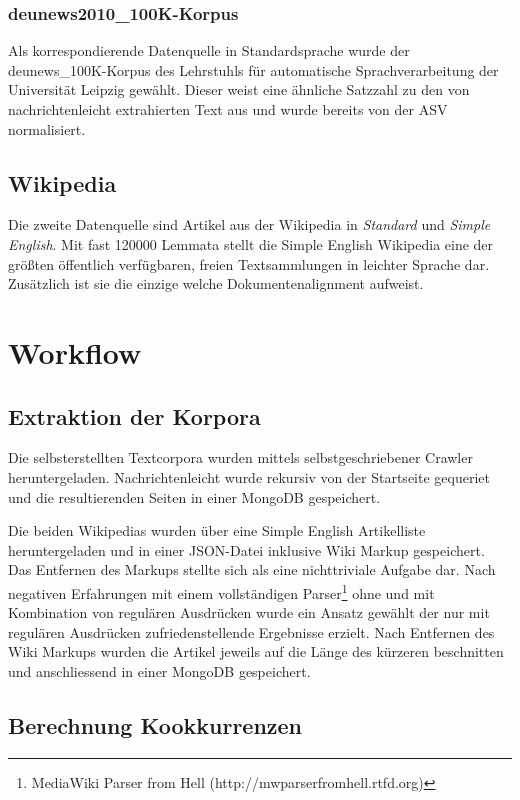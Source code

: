 \documentclass[12pt, a4paper]{article}
\begin{document}
\subsubsection{deunews2010\_100K-Korpus}

Als korrespondierende Datenquelle in Standardsprache wurde der
deunews\_100K-Korpus des Lehrstuhls f\"ur automatische Sprachverarbeitung
der Universit\"at Leipzig gew\"ahlt. Dieser weist eine \"ahnliche Satzzahl zu
den von nachrichtenleicht extrahierten Text aus und wurde bereits von der ASV
normalisiert.

\subsection{Wikipedia}

Die zweite Datenquelle sind Artikel aus der Wikipedia in \emph{Standard} und
\emph{Simple English}. Mit fast 120000 Lemmata stellt die Simple English
Wikipedia eine der gr\"o\ss{}ten \"offentlich verf\"ugbaren, freien
Textsammlungen in leichter Sprache dar. Zus\"atzlich ist sie die einzige
welche Dokumentenalignment aufweist.

\section{Workflow}
\subsection{Extraktion der Korpora}

Die selbsterstellten Textcorpora wurden mittels selbstgeschriebener Crawler
heruntergeladen. Nachrichtenleicht wurde rekursiv von der Startseite gequeriet
und die resultierenden Seiten in einer MongoDB gespeichert. 

Die beiden Wikipedias wurden \"uber eine Simple English Artikelliste
heruntergeladen und in einer JSON-Datei inklusive Wiki Markup gespeichert. Das
Entfernen des Markups stellte sich als eine nichttriviale Aufgabe dar. Nach
negativen Erfahrungen mit einem vollst\"andigen Parser\footnote{MediaWiki
Parser from Hell (http://mwparserfromhell.rtfd.org)} ohne und mit Kombination
von regul\"aren Ausdr\"ucken wurde ein Ansatz gew\"ahlt der nur mit regul\"aren
Ausdr\"ucken zufriedenstellende Ergebnisse erzielt. Nach Entfernen des Wiki
Markups wurden die Artikel jeweils auf die L\"ange des k\"urzeren beschnitten
und anschliessend in einer MongoDB gespeichert.

\subsection{Berechnung Kookkurrenzen}
\end{document}
